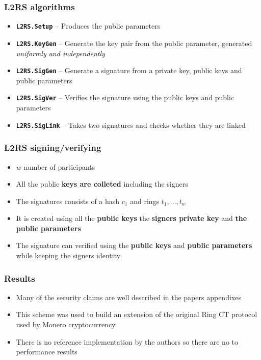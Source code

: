 \documentclass[%
  14pt,       				%
	c,                  %
	aspectratio=1610,   %
	unicode,						%
]{beamer}				    	%
\begin{document}
\begin{frame}
	\frametitle{L2RS algorithms}
	\large{
		\begin{itemize}
			\item \textbf{\texttt{L2RS.Setup}} -- Produces the public parameters
			\item \textbf{\texttt{L2RS.KeyGen}} -- Generate the key pair from the public parameter, generated \textit{uniformly and independently}
			\item \textbf{\texttt{L2RS.SigGen}} -- Generate a signature from a private key, public keys and public parameters
			\item \textbf{\texttt{L2RS.SigVer}} -- Verifies the signature using the public keys and public parameters
			\item \textbf{\texttt{L2RS.SigLink}} -- Takes two signatures and checks whether they are linked
		\end{itemize}
	}
\end{frame}

\begin{frame}
  \frametitle{L2RS signing/verifying}
  \large{
    \begin{itemize}
      \item $w$ number of participants
      \item All the public \textbf{keys are colleted} including the signers
      \item The signatures consists of a hash $c_1$ and rings $t_1,\dots,t_w$
      \item It is created using all the \textbf{public keys} the \textbf{signers private key} and \textbf{the public parameters}
      \item The signature can verified using the \textbf{public keys} and \textbf{public parameters} while keeping the signers identity
    \end{itemize}
  }
\end{frame}

\begin{frame}
  \frametitle{Results}
  \large{
    \begin{itemize}
      \item Many of the security claims are well described in the papers appendixes
      \item This scheme was used to build an extension of the original Ring CT protocol used by Monero cryptocurrency
      \item There is no reference implementation by the authors so there are no to performance results
    \end{itemize}
  }
\end{frame}
\end{document}
